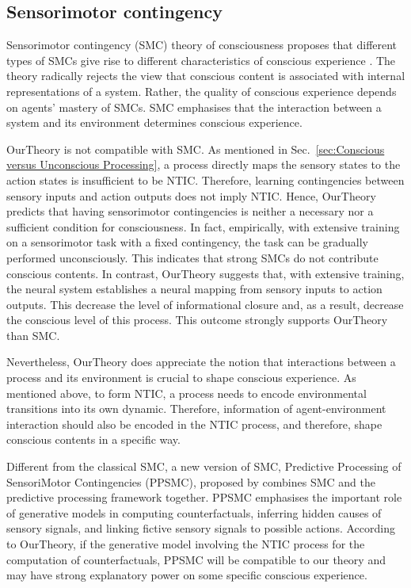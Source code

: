 \documentclass[utf8]{article}
\begin{document}
		\subsection{Sensorimotor contingency}
    		Sensorimotor contingency (SMC) theory of consciousness proposes that different types of SMCs give rise to different characteristics of conscious experience \citep{o2001sensorimotor}. The theory radically rejects the view that conscious content is associated with internal representations of a system. Rather, the quality of conscious experience depends on agents' mastery of SMCs. SMC emphasises that the interaction between a system and its environment determines conscious experience. 
    	
    	    \ac{OurTheory} is not compatible with SMC. As mentioned in Sec.~\ref{sec:Conscious versus Unconscious Processing}, a process directly maps the sensory states to the action states is insufficient to be NTIC. Therefore, learning contingencies between sensory inputs and action outputs does not imply NTIC. Hence, \ac{OurTheory} predicts that having sensorimotor contingencies is neither a necessary nor a sufficient condition for consciousness. In fact, empirically, with extensive training on a sensorimotor task with a fixed contingency, the task can be gradually performed unconsciously. This indicates that strong SMCs do not contribute conscious contents. In contrast, \ac{OurTheory} suggests that, with extensive training, the neural system establishes a neural mapping from sensory inputs to action outputs. This decrease the level of informational closure and, as a result, decrease the conscious level of this process. This outcome strongly supports \ac{OurTheory} than SMC. 
    	    
    	    Nevertheless, \ac{OurTheory} does appreciate the notion that interactions between a process and its environment is crucial to shape conscious experience. As mentioned above, to form NTIC, a process needs to encode environmental transitions into its own dynamic. Therefore, information of agent-environment interaction should also be encoded in the NTIC process, and therefore, shape conscious contents in a specific way. 
    	    
    	    Different from the classical SMC, a new version of SMC, Predictive Processing of SensoriMotor Contingencies (PPSMC), proposed by \cite{seth2014predictive, seth2015presence} combines SMC and the predictive processing framework together. PPSMC emphasises the important role of generative models in computing counterfactuals, inferring hidden causes of sensory signals, and linking fictive sensory signals to possible actions. According to \ac{OurTheory}, if the generative model involving the NTIC process for the computation of counterfactuals, PPSMC will be compatible to our theory and may have strong explanatory power on some specific conscious experience.
    	    
\end{document}
